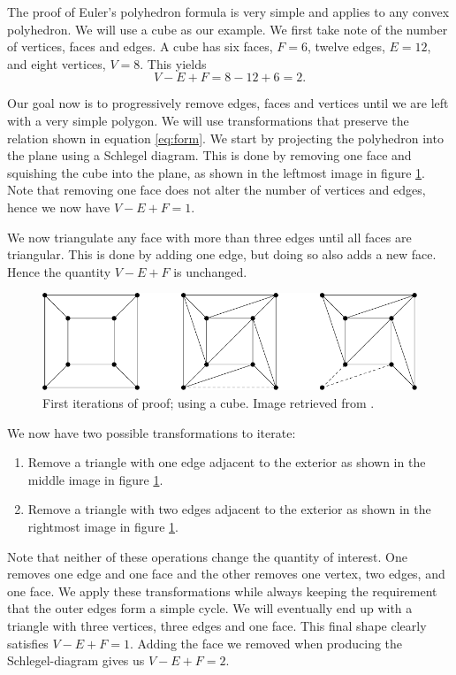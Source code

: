 \documentclass{amsart}
\theoremstyle{plain}
\theoremstyle{definition}
\begin{document}
The proof of Euler's polyhedron formula is very simple and applies to any
convex polyhedron. We will use a cube as our example. We first take note of the
number of vertices, faces and edges. A cube has six faces, $F = 6$, twelve
edges, $E = 12$, and eight vertices, $V = 8$. This yields
\begin{equation}
    \label{eq:form}
    V - E + F = 8 - 12 + 6 = 2.
\end{equation}

Our goal now is to progressively remove edges, faces and vertices until we are
left with a very simple polygon. We will use transformations that preserve the
relation shown in equation \ref{eq:form}. We start by projecting the polyhedron
into the plane using a Schlegel diagram. This is done by removing one face and
squishing the cube into the plane, as shown in the leftmost image in figure
\ref{fig:proof}. Note that removing one face does not alter the number of
vertices and edges, hence we now have $V - E + F = 1$.

We now triangulate any face with more than three edges until all faces are
triangular. This is done by adding one edge, but doing so also adds a new face.
Hence the quantity $V - E + F$ is unchanged.

\begin{figure}[ht!]
    \centering
    \includegraphics{drawing.pdf}
    \caption{First iterations of proof; using a cube. Image retrieved from \cite{image}.}
    \label{fig:proof}
\end{figure}

We now have two possible transformations to iterate: 
\begin{enumerate}
    \item Remove a triangle with one edge adjacent to the exterior as shown in
        the middle image in figure \ref{fig:proof}.  
    \item Remove a triangle
        with two edges adjacent to the exterior as shown in the rightmost image
        in figure \ref{fig:proof}.
\end{enumerate}
Note that neither of these operations change the quantity of interest. One
removes one edge and one face and the other removes one vertex, two edges, and
one face. We apply these transformations while always keeping the requirement
that the outer edges form a simple cycle. We will eventually end up with a
triangle with three vertices, three edges and one face. This final shape
clearly satisfies ${V - E + F = 1}$.  Adding the face we removed when producing
the Schlegel-diagram gives us ${V - E + F = 2}$.
\end{document}
